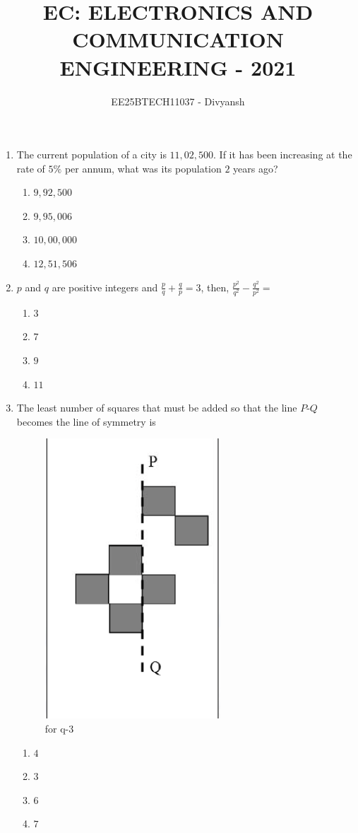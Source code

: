 \documentclass[journal,12pt,onecolumn]{IEEEtran}
\title{EC: ELECTRONICS AND COMMUNICATION ENGINEERING - 2021}
\author{EE25BTECH11037 - Divyansh}
\theoremstyle{remark}
\begin{document}
\maketitle
\begin{enumerate}

\section{General Aptitude}
\item The current population of a city is $11,02,500$. If it has been increasing at the rate of $5\%$ per annum, what was its population $2$ years ago?
\begin{multicols}{4}
\begin{enumerate}
\item $9,92,500$
\item $9,95,006$
\item $10,00,000$
\item $12,51,506$
\end{enumerate}
\end{multicols}
\hfill {}

\item $p$ and $q$ are positive integers and $\frac{p}{q} + \frac{q}{p}=3$, then, $\frac{p^2}{q^2} - \frac{q^2}{p^2}=$
\begin{multicols}{4}
\begin{enumerate}
\item $3$
\item $7$
\item $9$
\item $11$
\end{enumerate}
\end{multicols}
\hfill {}

\item The least number of squares that must be added so that the line $P$-$Q$ becomes the line of symmetry is
\begin{figure}[H]
    \centering
    \includegraphics[width=0.2\columnwidth]{figs/1.png}
    \caption{\centering for q-3}
    \label{fig:placeholder_1}
\end{figure}
\begin{multicols}{4}
\begin{enumerate}
\item $4$
\item $3$
\item $6$
\item $7$
\end{enumerate}
\end{multicols}
\hfill {}


\end{enumerate}
\end{document}
